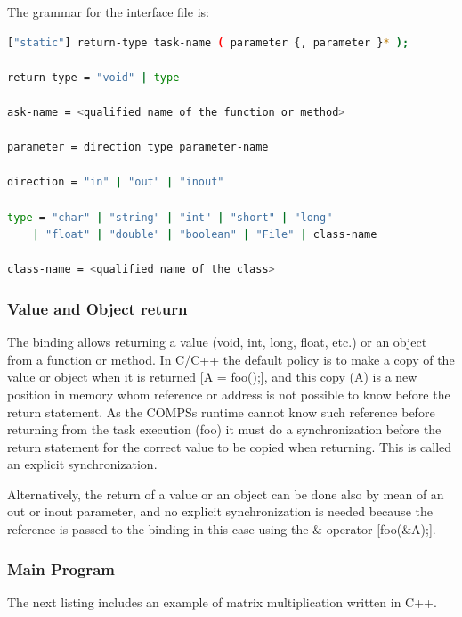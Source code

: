 The grammar for the interface file is:

\begin{lstlisting}[language=bash]
["static"] return-type task-name ( parameter {, parameter }* );

return-type = "void" | type

ask-name = <qualified name of the function or method>

parameter = direction type parameter-name

direction = "in" | "out" | "inout"

type = "char" | "string" | "int" | "short" | "long"
    | "float" | "double" | "boolean" | "File" | class-name

class-name = <qualified name of the class>
\end{lstlisting}

       
\subsubsection{Value and Object return}
The binding allows returning a value (void, int, long, float, etc.) or an object from a 
function or method. In C/C++ the default policy is to make a copy of the value or object when it is returned [A = foo();], 
and this copy (A) is a new position in memory whom reference or address is not possible to know before 
the return statement. As the COMPSs runtime cannot know such reference before returning from the task execution (foo) it must do a 
synchronization before the return statement for the correct value to be copied when returning. 
This is called an explicit synchronization.

Alternatively, the return of a value or an object can be done also by mean of an out or inout parameter, 
and no explicit synchronization is needed because the reference is passed to the binding in this case 
using the \& operator [foo(\&A);].

\subsubsection{Main Program}
The next listing includes an example of matrix multiplication written in C++.

